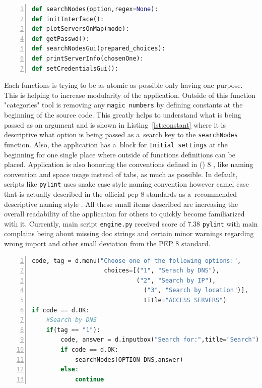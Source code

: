 {{{\noindent\begin{minipage}{\linewidth}
\begin{lstlisting}[language=Python, numbers=left, label={lst:descriptive}, caption=Example of Function Names, frame=single, showstringspaces=false, breaklines=true, keywordstyle=\color{blue},captionpos=b]
def searchNodes(option,regex=None):
def initInterface():
def plotServersOnMap(mode):
def getPasswd():
def searchNodesGui(prepared_choices):
def printServerInfo(chosenOne):
def setCredentialsGui():
\end{lstlisting}
\end{minipage}

Each functions is trying to be as atomic as possible only having one purpose. This is helping to increase modularity of the application. Outside of this function "categories" tool is removing any \texttt{magic numbers} by defining constants at the beginning of the source code. This greatly helps to understand what is being passed as an argument and is shown in Listing~\ref{lst:constant} where it is descriptive what option is being passed as a~search key to the \texttt{searchNodes} function. Also, the application has a~block for \texttt{Initial settings} at the beginning for one single place where outside of functions definitions can be placed. Application is also honoring the conventions defined in  () 8 \cite{pythonpep}, like naming convention and space usage instead of tabs, as much as possible. In default, scripts like \texttt{pylint} uses snake case style naming convention however camel case that is actually described in the official pep 8 standards as a~recommended descriptive naming style \cite{pythonpep}. All these small items described are increasing the overall readability of the application for others to quickly become familiarized with it. Currently, main script \texttt{engine.py} received score of 7.38  \texttt{pylint} with main complains being about missing doc strings and certain minor warnings regarding wrong import and other small deviation from the PEP 8 standard.

{\noindent\begin{minipage}{\linewidth}
\begin{lstlisting}[language=Python, numbers=left, label={lst:constant}, caption=Example of Constant Usage, frame=single, showstringspaces=false, breaklines=true, keywordstyle=\color{blue},captionpos=b]
code, tag = d.menu("Choose one of the following options:",
					choices=[("1", "Serach by DNS"),
				      		 ("2", "Search by IP"),
					    	   ("3", "Search by location")],
						       title="ACCESS SERVERS")
if code == d.OK:
	#Search by DNS
	if(tag == "1"):
		code, answer = d.inputbox("Search for:",title="Search")
		if code == d.OK:
			searchNodes(OPTION_DNS,answer)
		else:
			continue
\end{lstlisting}
\end{minipage}

}}}}
